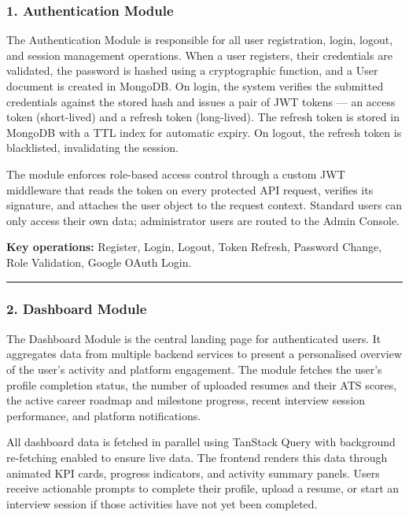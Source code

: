 \documentclass[12pt]{article}
\begin{document}
\subsubsection{1. Authentication Module}

The Authentication Module is responsible for all user registration, login, logout, and session management operations. When a user registers, their credentials are validated, the password is hashed using a cryptographic function, and a User document is created in MongoDB. On login, the system verifies the submitted credentials against the stored hash and issues a pair of JWT tokens — an access token (short-lived) and a refresh token (long-lived). The refresh token is stored in MongoDB with a TTL index for automatic expiry. On logout, the refresh token is blacklisted, invalidating the session.

The module enforces role-based access control through a custom JWT middleware that reads the token on every protected API request, verifies its signature, and attaches the user object to the request context. Standard users can only access their own data; administrator users are routed to the Admin Console.

\textbf{Key operations:} Register, Login, Logout, Token Refresh, Password Change, Role Validation, Google OAuth Login.

\noindent\rule{\textwidth}{0.4pt}

\subsubsection{2. Dashboard Module}

The Dashboard Module is the central landing page for authenticated users. It aggregates data from multiple backend services to present a personalised overview of the user's activity and platform engagement. The module fetches the user's profile completion status, the number of uploaded resumes and their ATS scores, the active career roadmap and milestone progress, recent interview session performance, and platform notifications.

All dashboard data is fetched in parallel using TanStack Query with background re-fetching enabled to ensure live data. The frontend renders this data through animated KPI cards, progress indicators, and activity summary panels. Users receive actionable prompts to complete their profile, upload a resume, or start an interview session if those activities have not yet been completed.
\end{document}
